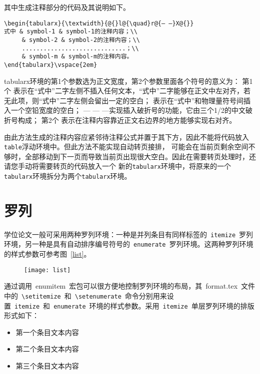 其中生成注释部分的代码及其说明如下。
\vspace{1em}
\begin{lstlisting}
\begin{tabularx}{\textwidth}{@{}l@{\quad}r@{— —}X@{}}
式中 & symbol-1 & symbol-1的注释内容；\\
     & symbol-2 & symbol-2的注释内容；\\
     .............................；\\
     & symbol-m & symbol-m的注释内容。
\end{tabularx}\vspace{2em}
\end{lstlisting}


tabularx环境的第1个参数选为正文宽度，第2个参数里面各个符号的意义为：
    第1个 \@{}表示在“式中”二字左侧不插入任何文本，“式中”二字能够在正文中左对齐，若无此项，则“式中”二字左侧会留出一定的空白；
    \@{\quad}表示在“式中”和物理量符号间插入一个空铅宽度的空白；
    \@{— — —}实现插入破折号的功能，它由三个1/2的中文破折号构成；
    第2个 \@{}表示在注释内容靠近正文右边界的地方能够实现右对齐。


由此方法生成的注释内容应紧邻待注释公式并置于其下方，因此不能将代码放入\verb|table|浮动环境中。但此方法不能实现自动转页接排，
可能会在当前页剩余空间不够时，全部移动到下一页而导致当前页出现很大空白。因此在需要转页处理时，还请您手动将需要转页的代码放入一个
新的\verb|tabularx|环境中，将原来的一个\verb|tabularx|环境拆分为两个\verb|tabularx|环境。


\section{罗列}
学位论文一般可采用两种罗列环境：一种是并列条目有同样标签的~\verb|itemize|~罗列环境，另一种是具有自动排序编号符号的~\verb|enumerate|~罗列环境。这两种罗列环境的样式参数可参考图~\ref{list}。
\begin{figure}[htbp]
\centering
\texttt{[image: list]}
\vspace{-1em}
\end{figure}

通过调用~enumitem~宏包可以很方便地控制罗列环境的布局，其~format.tex~文件中的~\verb|\setitemize|~和~\verb|\setenumerate|~命令分别用来设置~\verb|itemize|~和~\verb|enumerate|~环境的样式参数。采用~\verb|itemize|~单层罗列环境的排版形式如下：

\begin{itemize}
\item 第一个条目文本内容
\item 第二个条目文本内容
\item 第三个条目文本内容
\end{itemize}

